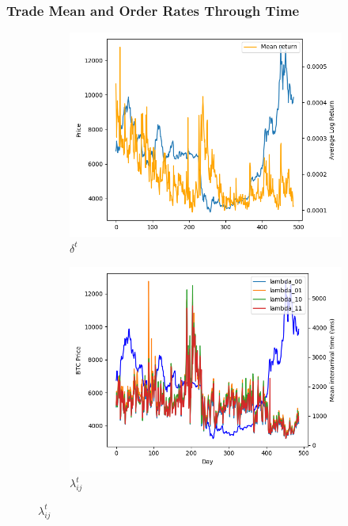 \documentclass[a4paper,10pt]{article}
\begin{document}
\subsubsection{Trade Mean and Order Rates Through Time}
\begin{figure}[h]
    \centering
    \begin{subfigure}[b]{0.4\textwidth}
        \includegraphics[width=\textwidth]{images/return_params}
        \caption{$\delta^t$}
    \end{subfigure}
    \begin{subfigure}[b]{0.4\textwidth}
        \includegraphics[width=\textwidth]{images/rate_params}
        \caption{$\lambda_{ij}^t$}
        \label{fig:log_returns_zoom}

\end{subfigure}
\end{figure}
\end{document}
